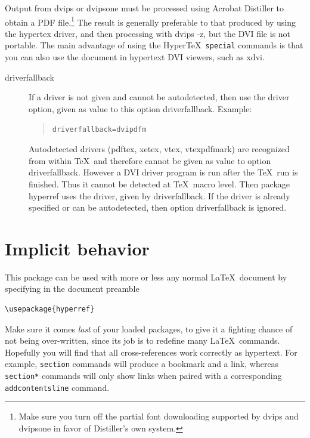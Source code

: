 \documentclass[pdftex]{article}
\newcommand{\bs}{\symbol{'134}}%
\newcommand{\ci}[1]{\texttt{\bs#1}}
\begin{document}
Output from \textsf{dvips} or \textsf{dvipsone} must be processed using
Acrobat Distiller to obtain a PDF file.\footnote{Make sure you turn off
the partial font downloading supported by \textsf{dvips} and
\textsf{dvipsone} in favor of Distiller's own system.} The result is
generally preferable to that produced by using the \textsf{hypertex}
driver, and then processing with \textsf{dvips -z}, but the DVI file is
not portable. The main advantage of using the Hyper\TeX\ \ci{special}
commands is that you can also use the document in hypertext DVI viewers,
such as \textsf{xdvi}.

\begin{description}
\item[driverfallback]
  If a driver is not given and cannot be autodetected, then use
  the driver option, given as value to this option \textsf{driverfallback}.
  Example:
  \begin{quote}
    \texttt{driverfallback=dvipdfm}
  \end{quote}
  Autodetected drivers (\textsf{pdftex}, \textsf{xetex}, \textsf{vtex},
  \textsf{vtexpdfmark}) are recognized from within \TeX\ and
  therefore cannot be given as value to option \textsf{driverfallback}.
  However a DVI driver program is run after the \TeX\ run is finished.
  Thus it cannot be detected at \TeX\ macro level. Then package hyperref
  uses the driver, given by \textsf{driverfallback}. If the driver
  is already specified or can be autodetected, then option
  \textsf{driverfallback} is ignored.
\end{description}

\section{Implicit behavior}

This package can be used with more or less any normal \LaTeX\ document
by specifying in the document preamble

\begin{verbatim}
\usepackage{hyperref}
\end{verbatim}

Make sure it comes \emph{last} of your loaded packages, to give it a
fighting chance of not being over-written, since its job is to redefine
many \LaTeX\ commands. Hopefully you will find that all cross-references
work correctly as hypertext. For example, \ci{section} commands will
produce a bookmark and a link, whereas \ci{section*} commands will only
show links when paired with a corresponding \ci{addcontentsline}
command.
\end{document}
